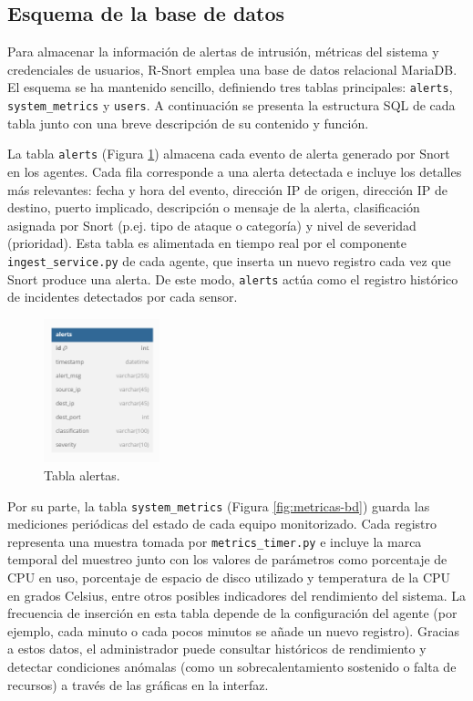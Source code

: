 \documentclass[11pt,a4paper,twoside]{report}
\begin{document}
\subsection{Esquema de la base de datos}

Para almacenar la información de alertas de intrusión, métricas del sistema y credenciales de usuarios, R-Snort emplea una base de datos relacional MariaDB. El esquema se ha mantenido sencillo, definiendo tres tablas principales: \texttt{alerts}, \texttt{system\_metrics} y \texttt{users}. A continuación se presenta la estructura SQL de cada tabla junto con una breve descripción de su contenido y función.\newline

La tabla \texttt{alerts} (Figura \ref{fig:alertas-bd}) almacena cada evento de alerta generado por Snort en los agentes. Cada fila corresponde a una alerta detectada e incluye los detalles más relevantes: fecha y hora del evento, dirección IP de origen, dirección IP de destino, puerto implicado, descripción o mensaje de la alerta, clasificación asignada por Snort (p.ej. tipo de ataque o categoría) y nivel de severidad (prioridad). Esta tabla es alimentada en tiempo real por el componente \texttt{ingest\_service.py} de cada agente, que inserta un nuevo registro cada vez que Snort produce una alerta. De este modo, \texttt{alerts} actúa como el registro histórico de incidentes detectados por cada sensor.\newline

\begin{figure}[H]
	\centering
	\includegraphics[width=0.3\textwidth]{documento/7.png}
	\caption{Tabla alertas.}
	\label{fig:alertas-bd}
\end{figure}

Por su parte, la tabla \texttt{system\_metrics} (Figura \ref{fig:metricas-bd}) guarda las mediciones periódicas del estado de cada equipo monitorizado. Cada registro representa una muestra tomada por \texttt{metrics\_timer.py} e incluye la marca temporal del muestreo junto con los valores de parámetros como porcentaje de CPU en uso, porcentaje de espacio de disco utilizado y temperatura de la CPU en grados Celsius, entre otros posibles indicadores del rendimiento del sistema. La frecuencia de inserción en esta tabla depende de la configuración del agente (por ejemplo, cada minuto o cada pocos minutos se añade un nuevo registro). Gracias a estos datos, el administrador puede consultar históricos de rendimiento y detectar condiciones anómalas (como un sobrecalentamiento sostenido o falta de recursos) a través de las gráficas en la interfaz.\newline
\end{document}
